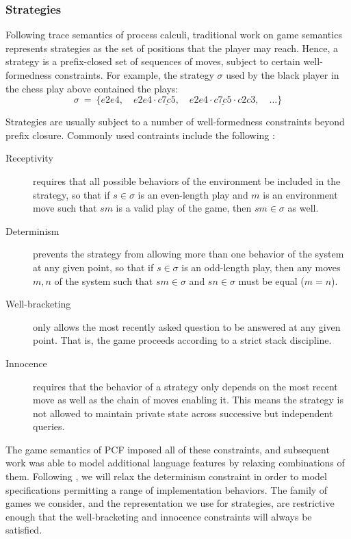 \documentclass[acmsmall,timestamp,review,anonymous]{acmart}
\begin{document}

\subsubsection{Strategies} %

Following trace semantics of process calculi,
traditional work on game semantics
represents strategies as
the set of positions that the player may reach.
Hence,
a strategy is a prefix-closed set of sequences of moves,
subject to certain well-formedness constraints.
For example,
the strategy $\sigma$ used by
the black player in the chess play above
contained the plays:
\[
  \sigma \: = \: \{
    e2e4, \quad
    e2e4 \cdot \underline{c7c5}, \quad
    e2e4 \cdot \underline{c7c5} \cdot c2c3, \quad
    \ldots
  \}
\]

Strategies are usually subject to a number
of well-formedness constraints beyond prefix closure.
Commonly used contraints include the following \cite{gamesem99}:
\begin{description}
\item[Receptivity]
  requires that all possible behaviors of the environment
  be included in the strategy,
  so that if $s \in \sigma$ is an even-length play and
  $m$ is an environment move such that $sm$ is a valid play of the game,
  then $sm \in \sigma$ as well.
\item[Determinism]
  prevents the strategy from allowing
  more than one behavior of the system at any given point,
  so that if $s \in \sigma$ is an odd-length play,
  then any moves $m, n$ of the system
  such that $sm \in \sigma$ and $sn \in \sigma$
  must be equal ($m = n$).
\item[Well-bracketing]
  only allows the most recently asked question
  to be answered at any given point.
  That is,
  the game proceeds according to a strict stack discipline.
\item[Innocence]
  requires that the behavior of a strategy
  only depends on the most recent move
  as well as the chain of moves enabling it.
  This means the strategy is not allowed to maintain
  private state across
  successive but independent queries.
\end{description}
The game semantics of PCF
imposed all of these constraints,
and subsequent work was able to model additional language features
by relaxing combinations of them.
Following \cite{gsnondet},
we will relax the determinism constraint in order
to model specifications permitting
a range of implementation behaviors.
The family of games we consider,
and the representation we use for strategies,
are restrictive enough that
the well-bracketing and innocence constraints
will always be satisfied.
\end{document}
